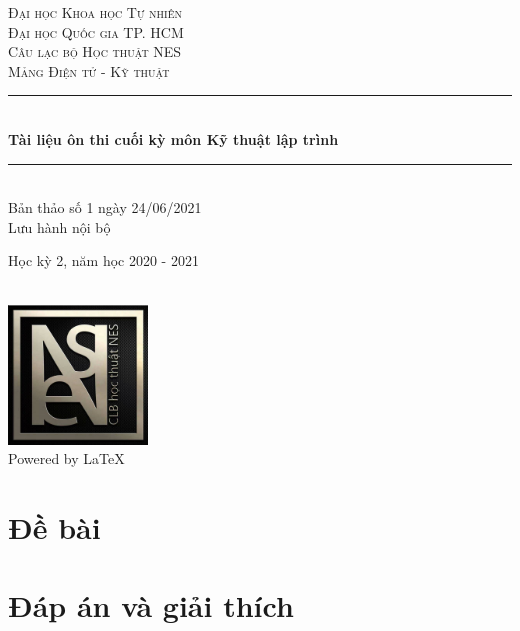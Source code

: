 \documentclass[12pt]{article}
\begin{document}
\begin{titlepage}

\newcommand{\HRule}{\rule{\linewidth}{0.5mm}} %

\center %
\vspace*{\fill}
 
\textsc{\LARGE Đại học Khoa học Tự nhiên}\\[0.2cm]
\textsc{\large Đại học Quốc gia TP. HCM }\\[1.5cm] 
\textsc{\Large Câu lạc bộ Học thuật NES}\\[0.2cm] 
\textsc{\large Mảng Điện tử - Kỹ thuật }\\[0.5cm]
\HRule \\[0.4cm]
{ \huge \bfseries Tài liệu ôn thi cuối kỳ môn\break 
Kỹ thuật lập trình}\\[0.4cm] %
\HRule \\[1.5cm]
\LARGE Bản thảo số 1 ngày 24/06/2021 \\
\LARGE Lưu hành nội bộ
~
\begin{minipage}{1\textwidth}
\begin{center}
    \LARGE Học kỳ 2, năm học 2020 - 2021
\end{center}
\end{minipage}\\[2cm]
\includegraphics[width=10em]{image/neslogo.jpg}\\[1.5cm]

\Large Powered by \LaTeX

\vspace*{\fill} %


\end{titlepage}
\renewcommand*\contentsname{Mục lục}
\setcounter{tocdepth}{2}
\tableofcontents
\pagebreak

\section{Đề bài}


\section{Đáp án và giải thích}


% 
% 
\end{document}
